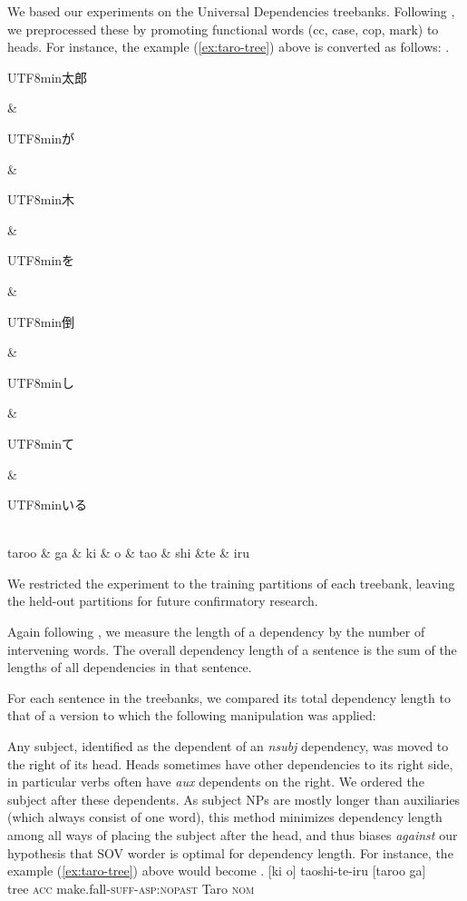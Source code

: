 \documentclass[11pt,a4paper]{article}
\newcommand{\japanese}[1]{\begin{CJK}{UTF8}{min}#1\end{CJK}}
\begin{document}
We based our experiments on the Universal Dependencies treebanks.
Following \cite{futrell2015largescale}, we preprocessed these by promoting functional words (cc, case, cop, mark) to heads.
For instance, the example (\ref{ex:taro-tree}) above is converted as follows:
\ex.
\begin{dependency}[theme = simple]
   \begin{deptext}[column sep=1em]
          \japanese{太郎} \& \japanese{が} \& \japanese{木} \& \japanese{を} \& \japanese{倒} \& \japanese{し} \& \japanese{て} \& \japanese{いる} \\
          taroo \& ga \& ki \& o \& tao \& shi \&te \& iru \\ 
   \end{deptext}
\end{dependency}


We restricted the experiment to the training partitions of each treebank, leaving the held-out partitions for future confirmatory research.

Again following \cite{futrell2015largescale}, we measure the length of a dependency by the number of intervening words.
The overall dependency length of a sentence is the sum of the lengths of all dependencies in that sentence.

For each sentence in the treebanks, we compared its total dependency length to that of a version to which the following manipulation was applied:

Any subject, identified as the dependent of an \textit{nsubj} dependency, was moved to the right of its head.
Heads sometimes have other dependencies to its right side, in particular verbs often have \textit{aux} dependents on the right.
We ordered the subject after these dependents.
As subject NPs are mostly longer than auxiliaries (which always consist of one word), this method minimizes dependency length among all ways of placing the subject after the head, and thus biases \emph{against} our hypothesis that SOV worder is optimal for dependency length.
For instance, the example (\ref{ex:taro-tree}) above would become
\exg.  [ki o] taoshi-te-iru [taroo ga] \\
 tree \textsc{acc} make.fall-\textsc{suff}-\textsc{asp:nopast} Taro \textsc{nom}\\
\end{document}
